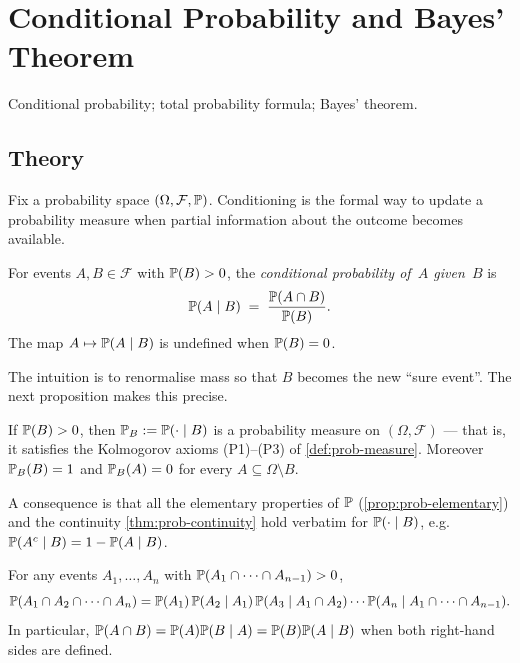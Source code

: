 
\section{Conditional Probability and Bayes' Theorem}
\label{sec:1.2.02-conditional-bayes}

\begin{ticket}
Conditional probability; total probability formula; Bayes' theorem.
\end{ticket}

\subsection*{Theory}

Fix a probability space $(\Omega, \mathcal{F}, \mathbb{P})$. Conditioning is
the formal way to update a probability measure when partial
information about the outcome becomes available.

\begin{definition}
\label{def:conditional-probability}
For events $A, B \in \mathcal{F}$ with $\mathbb{P}(B) > 0$, the
\emph{conditional probability of~$A$ given~$B$} is
\[
  \mathbb{P}(A \mid B) \;=\; \frac{\mathbb{P}(A \cap B)}{\mathbb{P}(B)}.
\]
The map $A \mapsto \mathbb{P}(A \mid B)$ is undefined when $\mathbb{P}(B) = 0$.
\end{definition}

The intuition is to renormalise mass so that $B$ becomes the new
``sure event''. The next proposition makes this precise.

\begin{proposition}
\label{prop:cond-is-measure}
If $\mathbb{P}(B) > 0$, then $\mathbb{P}_B := \mathbb{P}(\cdot \mid B)$ is a
probability measure on $(\Omega, \mathcal{F})$ — that is, it satisfies
the Kolmogorov axioms (P1)–(P3) of \cref{def:prob-measure}. Moreover
$\mathbb{P}_B(B) = 1$ and $\mathbb{P}_B(A) = 0$ for every $A \subseteq \Omega \setminus B$.
\end{proposition}

A consequence is that all the elementary properties of $\mathbb{P}$
(\cref{prop:prob-elementary}) and the continuity \cref{thm:prob-continuity}
hold verbatim for $\mathbb{P}(\cdot \mid B)$, e.g.\ $\mathbb{P}(A^c \mid B) = 1 - \mathbb{P}(A \mid B)$.

\begin{proposition}
\label{prop:multiplication-rule}
For any events $A_1, \dots, A_n$ with $\mathbb{P}(A_1 \cap \cdots \cap A_{n-1}) > 0$,
\[
  \mathbb{P}(A_1 \cap A_2 \cap \cdots \cap A_n)
  = \mathbb{P}(A_1)\, \mathbb{P}(A_2 \mid A_1)\, \mathbb{P}(A_3 \mid A_1 \cap A_2) \cdots \mathbb{P}(A_n \mid A_1 \cap \cdots \cap A_{n-1}).
\]
In particular, $\mathbb{P}(A \cap B) = \mathbb{P}(A) \mathbb{P}(B \mid A) = \mathbb{P}(B) \mathbb{P}(A \mid B)$ when
both right-hand sides are defined.
\end{proposition}

